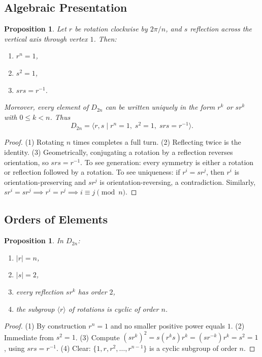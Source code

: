 \documentclass[12pt]{article}
\newtheorem{proposition}[theorem]{Proposition}
\theoremstyle{definition}
\begin{document}
\subsection*{Algebraic Presentation}
\begin{proposition}
Let $r$ be rotation clockwise by $2\pi/n$, and $s$ reflection across the vertical axis
through vertex $1$. Then:
\begin{enumerate}
    \item $r^n=1$,
    \item $s^2=1$,
    \item $srs = r^{-1}$.
\end{enumerate}
Moreover, every element of $D_{2n}$ can be written uniquely in the form $r^k$ or $sr^k$
with $0\leq k<n$. Thus
\[
D_{2n} = \langle r,s \mid r^n=1,\; s^2=1,\; srs=r^{-1}\rangle.
\]
\end{proposition}

\begin{proof}
(1) Rotating $n$ times completes a full turn.  
(2) Reflecting twice is the identity.  
(3) Geometrically, conjugating a rotation by a reflection reverses orientation,
so $srs=r^{-1}$.  
To see generation: every symmetry is either a rotation or reflection followed by a rotation.
To see uniqueness: if $r^i=sr^j$, then $r^i$ is orientation-preserving and $sr^j$ is orientation-reversing,
a contradiction. Similarly, $sr^i=sr^j \implies r^i=r^j \implies i\equiv j \pmod n$.
\end{proof}

\subsection*{Orders of Elements}

\begin{proposition}
In $D_{2n}$:
\begin{enumerate}
    \item $|r|=n$,
    \item $|s|=2$,
    \item every reflection $sr^k$ has order $2$,
    \item the subgroup $\langle r\rangle$ of rotations is cyclic of order $n$.
\end{enumerate}
\end{proposition}

\begin{proof}
(1) By construction $r^n=1$ and no smaller positive power equals $1$.  
(2) Immediate from $s^2=1$.  
(3) Compute $(sr^k)^2 = s(r^k s)r^k = (sr^{-k})r^k = s^2=1$, using $srs=r^{-1}$.  
(4) Clear: $\{1,r,r^2,\dots,r^{n-1}\}$ is a cyclic subgroup of order $n$.
\end{proof}
\end{document}
